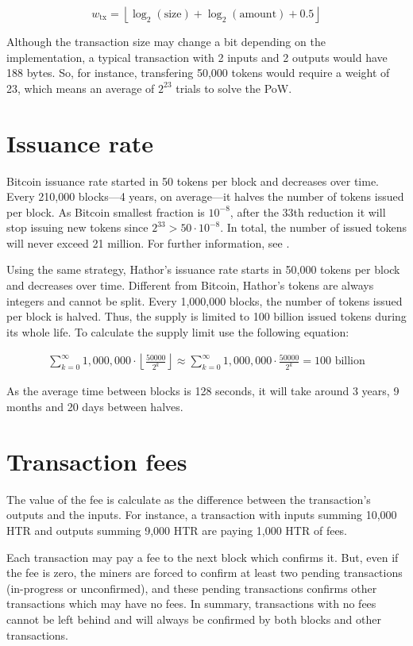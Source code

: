 $$w_\text{tx} = \left\lfloor \log_2(\text{size}) + \log_2(\text{amount}) + 0.5 \right\rfloor$$

Although the transaction size may change a bit depending on the implementation, a typical transaction with 2 inputs and 2 outputs would have 188 bytes. So, for instance, transfering 50,000 tokens would require a weight of 23, which means an average of $2^{23}$ trials to solve the PoW.


\section{Issuance rate}

Bitcoin issuance rate started in 50 tokens per block and decreases over time. Every 210,000 blocks---4 years, on average---it halves the number of tokens issued per block. As Bitcoin smallest fraction is $10^{-8}$, after the 33th reduction it will stop issuing new tokens since $2^{33} > 50 \cdot 10^{-8}$. In total, the number of issued tokens will never exceed 21 million. For further information, see \cite{bitcoinsupply}.

Using the same strategy, Hathor's issuance rate starts in 50,000 tokens per block and decreases over time. Different from Bitcoin, Hathor's tokens are always integers and cannot be split. Every 1,000,000 blocks, the number of tokens issued per block is halved. Thus, the supply is limited to 100 billion issued tokens during its whole life. To calculate the supply limit use the following equation:

\begin{align*}
    \sum_{k=0}^{\infty} 1,000,000 \cdot \left\lfloor \frac{50000}{2^k} \right\rfloor \approx
    \sum_{k=0}^{\infty} 1,000,000 \cdot \frac{50000}{2^k} = 100 \text{ billion}
\end{align*}

As the average time between blocks is 128 seconds, it will take around 3 years, 9 months and 20 days between halves.


\section{Transaction fees}

The value of the fee is calculate as the difference between the transaction's outputs and the inputs. For instance, a transaction with inputs summing 10,000 HTR and outputs summing 9,000 HTR are paying 1,000 HTR of fees.

Each transaction may pay a fee to the next block which confirms it. But, even if the fee is zero, the miners are forced to confirm at least two pending transactions (in-progress or unconfirmed), and these pending transactions confirms other transactions which may have no fees. In summary, transactions with no fees cannot be left behind and will always be confirmed by both blocks and other transactions.

